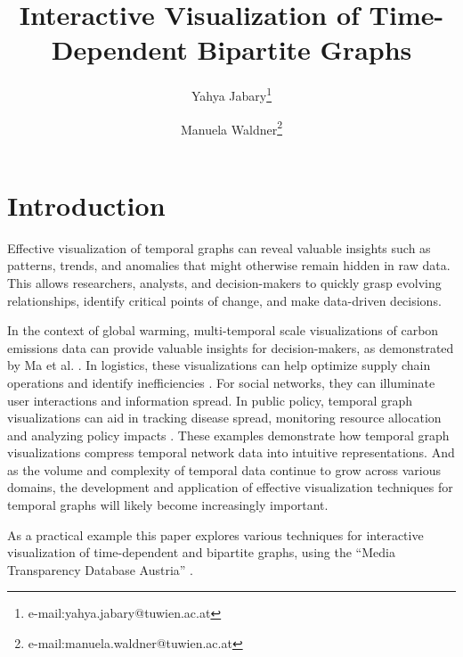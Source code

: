 \documentclass{vgtc}                          %
\title{Interactive Visualization of Time-Dependent Bipartite Graphs}
\author{Yahya Jabary\thanks{e-mail:yahya.jabary@tuwien.ac.at} %
\and Manuela Waldner\thanks{e-mail:manuela.waldner@tuwien.ac.at}}
\affiliation{\scriptsize TU Wien, Austria}
\begin{document}
  
\maketitle








\section{Introduction} %

Effective visualization of temporal graphs can reveal valuable insights such as patterns, trends, and anomalies that might otherwise remain hidden in raw data. This allows researchers, analysts, and decision-makers to quickly grasp evolving relationships, identify critical points of change, and make data-driven decisions.

In the context of global warming, multi-temporal scale visualizations of carbon emissions data can provide valuable insights for decision-makers, as demonstrated by Ma et al. \cite{ma2023histgnn}. In logistics, these visualizations can help optimize supply chain operations and identify inefficiencies \cite{Yang2019AnimatedMS} \cite{Tamilmani2019ModellingAA}. For social networks, they can illuminate user interactions and information spread. In public policy, temporal graph visualizations can aid in tracking disease spread, monitoring resource allocation and analyzing policy impacts \cite{chung2023temporal}.
These examples demonstrate how temporal graph visualizations compress temporal network data into intuitive representations. And as the volume and complexity of temporal data continue to grow across various domains, the development and application of effective visualization techniques for temporal graphs will likely become increasingly important.

\medskip

As a practical example this paper explores various techniques for interactive visualization of time-dependent and bipartite graphs, using the ``Media Transparency Database Austria'' \cite{dataset}.
\end{document}
